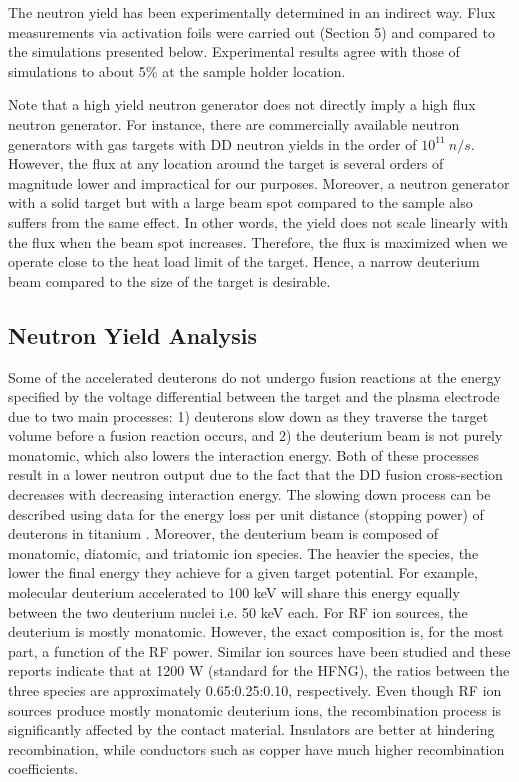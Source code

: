 \documentclass[review]{elsarticle}
\begin{document}
The neutron yield has been experimentally determined in an indirect way. Flux measurements via activation foils were carried out (Section 5) and compared to the simulations presented below. Experimental results agree with those of simulations to about 5\% at the sample holder location. 

Note that a high yield neutron generator does not directly imply a high flux neutron generator. For instance, there are commercially available neutron generators with gas targets with DD neutron yields in the order of $10^{11}\ n/s$. However, the flux at any location around the target is several orders of magnitude lower and impractical for our purposes. Moreover, a neutron generator with a solid target but with a large beam spot compared to the sample also suffers from the same effect. In other words, the yield does not scale linearly with the flux when the beam spot increases. Therefore, the flux is maximized when we operate close to the heat load limit of the target. Hence, a narrow deuterium beam compared to the size of the target is desirable.
	
\subsection{Neutron Yield Analysis}

Some of the accelerated deuterons do not undergo fusion reactions at the energy specified by the voltage differential between the target and the plasma electrode due to two main processes: 1) deuterons slow down as they traverse the target volume before a fusion reaction occurs, and 2) the deuterium beam is not purely monatomic, which also lowers the interaction energy. Both of these processes result in a lower neutron output due to the fact that the DD fusion cross-section decreases with decreasing interaction energy. The slowing down process can be described using data for the energy loss per unit distance (stopping power) of deuterons in titanium \cite{SRIM}. Moreover, the deuterium beam is composed of monatomic, diatomic, and triatomic ion species. The heavier the species, the lower the final energy they achieve for a given target potential. For example, molecular deuterium accelerated to 100 keV will share this energy equally between the two deuterium nuclei i.e. 50 keV each. For RF ion sources, the deuterium is mostly monatomic. However, the exact composition is, for the most part, a function of the RF power. Similar ion sources have been studied \cite{multicusp2} and these reports indicate that at 1200 W (standard for the HFNG), the ratios between the three species are approximately 0.65:0.25:0.10, respectively. Even though RF ion sources produce mostly monatomic deuterium ions, the recombination process is significantly affected by the contact material. Insulators are better at hindering recombination, while conductors such as copper have much higher recombination coefficients.  
\end{document}
